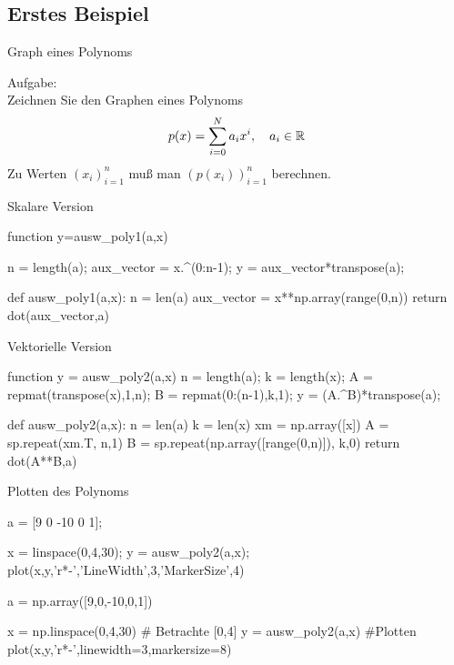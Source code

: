 \documentclass[hyperref={xetex}]{beamer}
\begin{document}
\subsection{Erstes Beispiel}
\begin{frame}[fragile]{Graph eines Polynoms}

\alert{Aufgabe:}\\
Zeichnen Sie  den Graphen eines Polynoms
\vspace*{-0.4cm}
\[ p(x)= \sum_{i=0}^N a_i x^i, \quad a_i \in \mathbb{R} 
\vspace*{-0.4cm} \]
Zu Werten $(x_i)_{i=1}^n$ muß man $(p(x_i))_{i=1}^n$ berechnen.

\end{frame}

\begin{frame}[fragile]{Skalare Version}
\begin{matlabin}[title=\tiny matlab]
function y=ausw_poly1(a,x)

n = length(a);
aux_vector = x.^(0:n-1);
y = aux_vector*transpose(a);
\end{matlabin}
\begin{pyin}[title=\tiny python]
def ausw_poly1(a,x):
    n = len(a)
    aux_vector = x**np.array(range(0,n))
    return dot(aux_vector,a)
\end{pyin}


\end{frame}
\begin{frame}[fragile]{Vektorielle Version}
\begin{matlabin}[title=\tiny matlab]
function y = ausw_poly2(a,x)
n = length(a);
k = length(x);
A = repmat(transpose(x),1,n);
B = repmat(0:(n-1),k,1);
y = (A.^B)*transpose(a);
\end{matlabin}
\begin{pyin}[title=\tiny python]
def ausw_poly2(a,x):
    n = len(a)
    k = len(x)
    xm = np.array([x])
    A = sp.repeat(xm.T, n,1)
    B = sp.repeat(np.array([range(0,n)]), k,0)
    return dot(A**B,a)
\end{pyin}
\end{frame}
\begin{frame}[fragile]{Plotten des Polynoms}
\begin{matlabin}[title=\tiny matlab]
a = [9 0 -10 0 1]; %

x = linspace(0,4,30); %
y = ausw_poly2(a,x);
plot(x,y,'r*-','LineWidth',3,'MarkerSize',4)
\end{matlabin}
\begin{pyin}[title=\tiny python]
a = np.array([9,0,-10,0,1])

x = np.linspace(0,4,30) # Betrachte [0,4]
y = ausw_poly2(a,x)
#Plotten
plot(x,y,'r*-',linewidth=3,markersize=8)
\end{pyin}
\end{frame}
\end{document}
